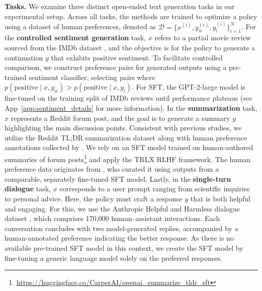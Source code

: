 \textbf{Tasks.} We examine three distinct open-ended text generation tasks in our experimental setup. Across all tasks, the methods are trained to optimize a policy using a dataset of human preferences, denoted as $\mathcal{D}=\bigl\{x^{(i)}, y_w^{(i)}, y_l^{(i)}\bigr\}_{i=1}^N$. For the \textbf{controlled sentiment generation} task, $x$ refers to a partial movie review sourced from the IMDb dataset \cite{maas-EtAl:2011:ACL-HLT2011}, and the objective is for the policy to generate a continuation $y$ that exhibits positive sentiment. To facilitate controlled comparison, we construct preference pairs for generated outputs using a pre-trained sentiment classifier, selecting pairs where $p(\text{positive}\mid x,y_w)>p(\text{positive}\mid x,y_l)$. For SFT, the GPT-2-large model is fine-tuned on the training split of IMDb reviews until performance plateaus (see App~\ref{app:sentiment_details} for more information). In the \textbf{summarization} task, $x$ represents a Reddit forum post, and the goal is to generate a summary $y$ highlighting the main discussion points. Consistent with previous studies, we utilize the Reddit TL;DR summarization dataset \citep{volske-etal-2017-tl} along with human preference annotations collected by \citeauthor{stiennon2022learning}. We rely on an SFT model trained on human-authored summaries of forum posts\footnote{\url{https://huggingface.co/CarperAI/openai_summarize_tldr_sft}} and apply the TRLX \citep{leandro_von_werra_2023_7790115} RLHF framework. The human preference data originates from \citeauthor{stiennon2022learning}, who curated it using outputs from a comparable, separately fine-tuned SFT model. Lastly, in the \textbf{single-turn dialogue} task, $x$ corresponds to a user prompt ranging from scientific inquiries to personal advice. Here, the policy must craft a response $y$ that is both helpful and engaging. For this, we use the Anthropic Helpful and Harmless dialogue dataset \citep{bai2022training}, which comprises 170,000 human–assistant interactions. Each conversation concludes with two model-generated replies, accompanied by a human-annotated preference indicating the better response. As there is no available pre-trained SFT model in this context, we create the SFT model by fine-tuning a generic language model solely on the preferred responses.

